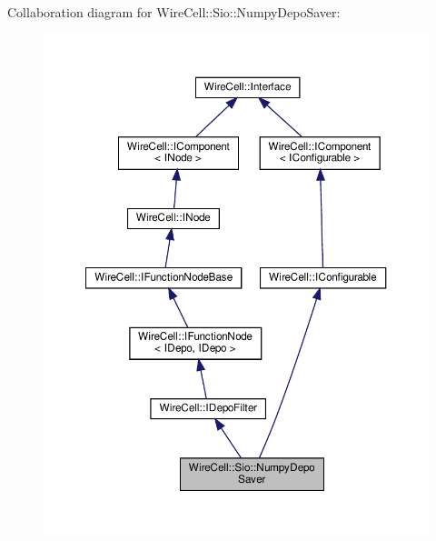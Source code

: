 Collaboration diagram for Wire\+Cell\+:\+:Sio\+:\+:Numpy\+Depo\+Saver\+:
\nopagebreak
\begin{figure}[H]
\begin{center}
\leavevmode
\includegraphics[width=350pt]{class_wire_cell_1_1_sio_1_1_numpy_depo_saver__coll__graph}
\end{center}
\end{figure}
